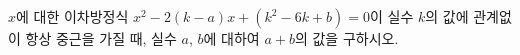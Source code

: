 $x$에 대한 이차방정식 $x^2-2(k-a)x+(k^2-6k+b)=0$이 실수 $k$의 값에 관계없이 항상 중근을 가질 때, 실수 $a$, $b$에 대하여 $a+b$의 값을 구하시오.
